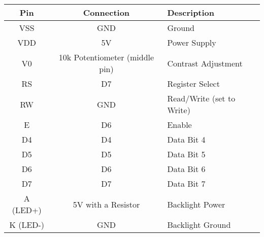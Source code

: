 \begin{table}[h!]
    \centering
    \renewcommand{\arraystretch}{1.3}
    \begin{tabular}{|c|c|l|}
        \hline
        \textbf{Pin} & \textbf{Connection} & \textbf{Description} \\
        \hline
        VSS  & GND & Ground \\
        VDD  & 5V  & Power Supply \\
        V0   & 10k Potentiometer (middle pin) & Contrast Adjustment \\
        RS   & D7  & Register Select \\
        RW   & GND & Read/Write (set to Write) \\
        E    & D6  & Enable \\
        D4   & D4  & Data Bit 4 \\
        D5   & D5  & Data Bit 5 \\
        D6   & D6  & Data Bit 6 \\
        D7   & D7  & Data Bit 7 \\
        A (LED+) & 5V with a Resistor & Backlight Power \\
        K (LED-) & GND & Backlight Ground \\
        \hline
    \end{tabular}
    \label{tab:lcd_pins}
\end{table}
